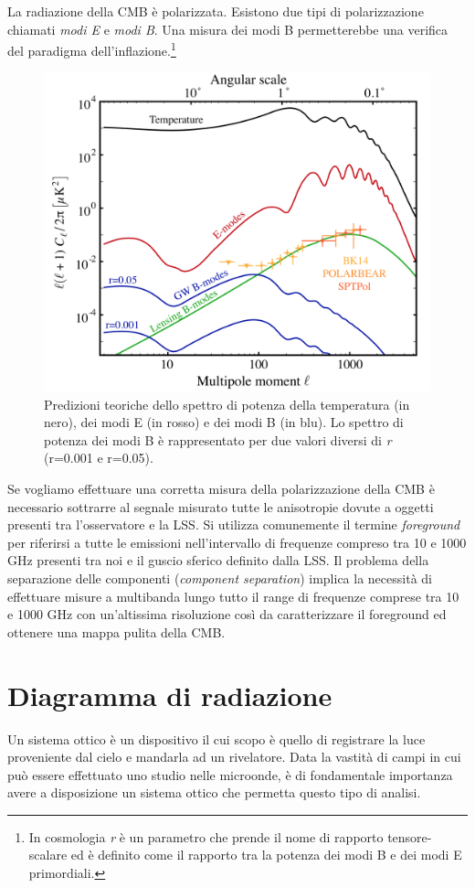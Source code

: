 \documentclass[12pt,a4paper,final]{book}
\begin{document}
La radiazione della CMB è polarizzata. Esistono due tipi di polarizzazione chiamati \textit{modi E} e \textit{modi B}. Una misura dei modi B permetterebbe una verifica del paradigma dell'inflazione.\footnote{In cosmologia \textit{r} è un parametro che prende il nome di rapporto tensore-scalare ed è definito come il rapporto tra la potenza dei modi B e dei modi E primordiali.}
\begin{figure}[!ht]
	\centering
	\includegraphics[width=0.7\linewidth]{../figures/power_spect.png}
	\caption{Predizioni teoriche dello spettro di potenza della temperatura (in nero), dei modi E (in rosso) e dei modi B (in blu). Lo spettro di potenza dei modi B è rappresentato per due valori diversi di \textit{r} (r=0.001 e r=0.05)\cite{libro_CMB}.}
	\label{power_spect}
\end{figure}

Se vogliamo effettuare una corretta misura della polarizzazione della CMB è necessario sottrarre al segnale misurato tutte le anisotropie dovute a oggetti presenti tra l'osservatore e la LSS. Si utilizza comunemente il termine \textit{foreground} per riferirsi a tutte le emissioni nell'intervallo di frequenze compreso tra 10 e 1000 GHz presenti tra noi e il guscio sferico definito dalla LSS.
Il problema della separazione delle componenti (\textit{component separation}) implica la necessità di effettuare misure a multibanda lungo tutto il range di frequenze comprese tra 10 e 1000 GHz con un'altissima risoluzione così da caratterizzare il foreground ed ottenere una mappa pulita della CMB.


\section{Diagramma di radiazione}\label{rad_pattern}
Un sistema ottico è un dispositivo il cui scopo è quello di registrare la luce proveniente dal cielo e mandarla ad un rivelatore.
Data la vastità di campi in cui può essere effettuato uno studio nelle microonde, è di fondamentale importanza avere a disposizione un sistema ottico che permetta questo tipo di analisi.
\end{document}

